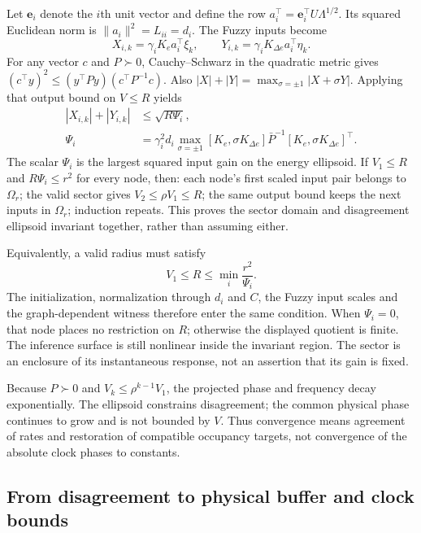 Let $\mathbf e_i$ denote the $i$th unit vector and define the row
$a_i^\top=\mathbf e_i^\top U\Lambda^{1/2}$. Its squared Euclidean norm
is $\|a_i\|^2=L_{ii}=d_i$. The Fuzzy inputs become
\begin{equation}
 X_{i,k}=\gamma_iK_ea_i^\top\xi_k,\qquad
 Y_{i,k}=\gamma_iK_{\Delta e}a_i^\top\eta_k.
 \label{detail:eq:btd_d_linear_outputs}
\end{equation}
For any vector $c$ and $P\succ0$, Cauchy--Schwarz in the quadratic
metric gives $(c^\top y)^2\le(y^\top P y)(c^\top P^{-1}c)$.
Also $|X|+|Y|=\max_{\sigma=\pm1}|X+\sigma Y|$. Applying that output
bound on $V\le R$ yields
\begin{align}
 |X_{i,k}|+|Y_{i,k}|&\le\sqrt{R\Psi_i},\nonumber\\
 \Psi_i&=\gamma_i^2d_i\max_{\sigma=\pm1}
 [K_e,\sigma K_{\Delta e}]\bar P^{-1}
 [K_e,\sigma K_{\Delta e}]^\top.
 \label{detail:eq:btd_input_factor}
\end{align}
The scalar $\Psi_i$ is the largest squared input gain on the energy
ellipsoid. If $V_1\le R$ and $R\Psi_i\le r^2$ for every node, then:
each node's first scaled input pair belongs to $\Omega_r$; the valid sector gives
$V_2\le\rho V_1\le R$; the same output bound keeps the next inputs in
$\Omega_r$; induction repeats. This proves the sector domain and
disagreement ellipsoid invariant together, rather than assuming either.

Equivalently, a valid radius must satisfy
\begin{equation}
 V_1\le R\le\min_i\frac{r^2}{\Psi_i}.
 \label{detail:eq:btd_sector_radius_condition}
\end{equation}
The initialization, normalization through $d_i$ and $C$, the Fuzzy input
scales and the graph-dependent witness therefore enter the same
condition. When $\Psi_i=0$, that node places no restriction on $R$;
otherwise the displayed quotient is finite. The inference surface is
still nonlinear inside the invariant region. The sector is an enclosure
of its instantaneous response, not an assertion that its gain is fixed.

Because $P\succ0$ and $V_k\le\rho^{k-1}V_1$, the projected phase and
frequency decay exponentially. The ellipsoid constrains disagreement;
the common physical phase continues to grow and is not bounded by $V$.
Thus convergence means agreement of rates and restoration of compatible
occupancy targets, not convergence of the absolute clock phases to constants.

\subsection{From disagreement to physical buffer and clock bounds}

